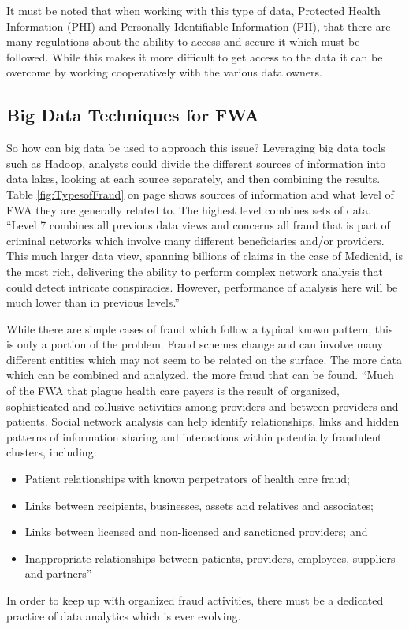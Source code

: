 \documentclass[sigconf]{acmart}
\begin{document}
It must be noted that when working with this type of data,  Protected Health Information
(PHI) and Personally Identifiable Information (PII), that there are many regulations about
the ability to access and secure it which must be followed.  While this makes it more
difficult to get access to the data it can be overcome by working cooperatively with the 
various data owners.  
  

\subsection{Big Data Techniques for FWA}

So how can big data be used to approach this issue?  Leveraging big data tools such as 
Hadoop, analysts could divide the different sources of information into data lakes, 
looking at each source separately, and then combining the results.  Table 
\ref{fig:TypesofFraud} on page \pageref{fig:TypesofFraud} shows sources of information 
and what level of FWA they are generally related to.  The highest level combines sets 
of data.  ``Level 7 combines all previous data views and concerns all fraud that is part 
of criminal networks which involve many different beneficiaries and/or providers. This 
much larger data view, spanning billions of claims in the case of Medicaid, is the most 
rich, delivering the ability to perform complex network analysis that could detect 
intricate conspiracies. However, performance of analysis here will be much lower than 
in previous levels.''\cite{THORNTON20131252} 

While there are simple cases of fraud which follow 
a typical known pattern, this is only a portion of the problem.  Fraud schemes 
change and can involve many different entities which may not seem to be related on the 
surface.  The more data which can be combined and analyzed, the more fraud that can be 
found.  ``Much of the FWA that plague health care payers is the result of organized, 
sophisticated and collusive activities among providers and between providers and patients. 
Social network analysis can help identify relationships, links and hidden patterns of 
information sharing and interactions within potentially fraudulent clusters, including:
\begin{itemize}
  \item Patient relationships with known perpetrators of health care fraud;
  \item Links between recipients, businesses, assets and relatives and associates;
  \item Links between licensed and non-licensed and sanctioned providers; and
  \item Inappropriate relationships between patients, providers, employees, suppliers 
  and partners''\cite{LexisNexis}
\end{itemize}
In order to keep up with organized fraud activities, there must be a dedicated practice 
of data analytics which is ever evolving. 
\end{document}
